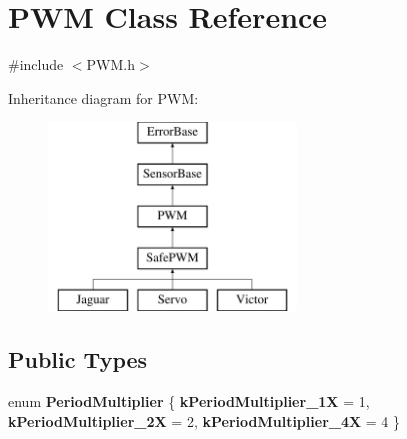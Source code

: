 \hypertarget{classPWM}{
\section{PWM Class Reference}
\label{classPWM}
}


{\ttfamily \#include $<$PWM.h$>$}

Inheritance diagram for PWM:\begin{figure}[H]
\begin{center}
\leavevmode
\includegraphics[height=5.000000cm]{classPWM}
\end{center}
\end{figure}
\subsection*{Public Types}
\begin{DoxyCompactItemize}
\item 
enum {\bfseries PeriodMultiplier} \{ {\bfseries kPeriodMultiplier\_\-1X} =  1, 
{\bfseries kPeriodMultiplier\_\-2X} =  2, 
{\bfseries kPeriodMultiplier\_\-4X} =  4
 \}
\end{DoxyCompactItemize}
